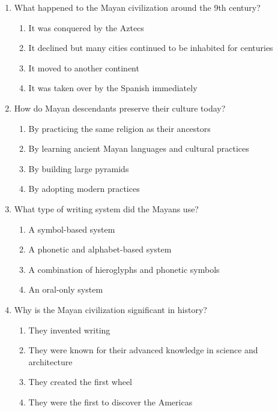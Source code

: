 \documentclass[12pt]{article}
\begin{document}
\begin{enumerate}
\vspace{0.5cm}

\item What happened to the Mayan civilization around the 9th century?
\begin{enumerate}[label=\Alph*.]
    \item It was conquered by the Aztecs
    \item It declined but many cities continued to be inhabited for centuries
    \item It moved to another continent
    \item It was taken over by the Spanish immediately
\end{enumerate}

\vspace{0.5cm}

\item How do Mayan descendants preserve their culture today?
\begin{enumerate}[label=\Alph*.]
    \item By practicing the same religion as their ancestors
    \item By learning ancient Mayan languages and cultural practices
    \item By building large pyramids
    \item By adopting modern practices
\end{enumerate}

\vspace{0.5cm}

\item What type of writing system did the Mayans use?
\begin{enumerate}[label=\Alph*.]
    \item A symbol-based system
    \item A phonetic and alphabet-based system
    \item A combination of hieroglyphs and phonetic symbols
    \item An oral-only system
\end{enumerate}

\vspace{0.5cm}

\item Why is the Mayan civilization significant in history?
\begin{enumerate}[label=\Alph*.]
    \item They invented writing
    \item They were known for their advanced knowledge in science and architecture
    \item They created the first wheel
    \item They were the first to discover the Americas
\end{enumerate}


\end{enumerate}
\end{document}
